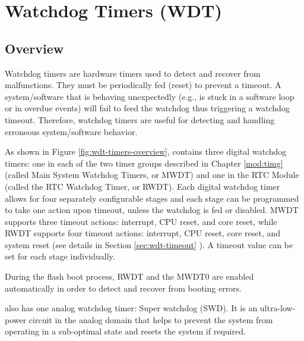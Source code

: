 \documentclass[main\_\_EN.tex]{subfiles}
\begin{document}

\ifglobal
\else
    {\let\clearpage\relax \listoftodos}
    {\let\clearpage\relax \listofdonetodos}
    \tableofcontents
\fi



\hypertarget{wdt}{}
\chapter{Watchdog Timers (WDT)}
\label{mod:wdt}

\section{Overview}

Watchdog timers are hardware timers used to detect and recover from malfunctions. They must be periodically fed (reset) to prevent a timeout. A system/software that is behaving unexpectedly (e.g., is stuck in a software loop or in overdue events) will fail to feed the watchdog thus triggering a watchdog timeout. Therefore, watchdog timers are useful for detecting and handling erroneous system/software behavior.

As shown in Figure \ref{fig:wdt-timers-overview}, \chipname{} contains three digital watchdog timers: one in each of the two timer groups described in Chapter \ref{mod:timg} \textit{} (called Main System Watchdog Timers, or MWDT) and one in the RTC Module (called the RTC Watchdog Timer, or RWDT). Each digital watchdog timer allows for four separately configurable stages and each stage can be programmed to take one action upon timeout, unless the watchdog is fed or disabled. MWDT supports three timeout actions: interrupt, CPU reset, and core reset, while RWDT supports four timeout actions: interrupt, CPU reset, core reset, and system reset (see details in Section \ref{sec:wdt-timeout} \textit{}). A timeout value can be set for each stage individually.

During the flash boot process, RWDT and the MWDT0 are enabled automatically in order to detect and recover from booting errors.

\chipname{} also has one analog watchdog timer: Super watchdog (SWD). It is an ultra-low-power circuit in the analog domain that helps to prevent the system from operating in a sub-optimal state and resets the system if required.
\end{document}
